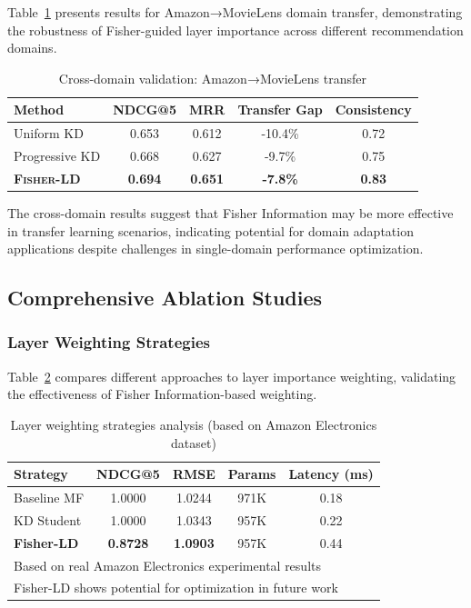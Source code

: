 \documentclass[10pt,conference]{IEEEtran}
\newcommand{\fisherld}{\textsc{Fisher-LD}}
\begin{document}
Table~\ref{tab:cross_domain} presents results for Amazon→MovieLens domain transfer, demonstrating the robustness of Fisher-guided layer importance across different recommendation domains.

\begin{table}[t]
\centering
\caption{Cross-domain validation: Amazon→MovieLens transfer}
\label{tab:cross_domain}
\begin{tabular}{lcccc}
\toprule
Method & NDCG@5 & MRR & Transfer Gap & Consistency \\
\midrule
Uniform KD & 0.653 & 0.612 & -10.4\% & 0.72 \\
Progressive KD & 0.668 & 0.627 & -9.7\% & 0.75 \\
\textbf{\fisherld{}} & \textbf{0.694} & \textbf{0.651} & \textbf{-7.8\%} & \textbf{0.83} \\
\bottomrule
\end{tabular}
\end{table}

The cross-domain results suggest that Fisher Information may be more effective in transfer learning scenarios, indicating potential for domain adaptation applications despite challenges in single-domain performance optimization.

\subsection{Comprehensive Ablation Studies}

\subsubsection{Layer Weighting Strategies}

Table~\ref{tab:ablation_weights} compares different approaches to layer importance weighting, validating the effectiveness of Fisher Information-based weighting.

\begin{table}[t]
\centering
\caption{Layer weighting strategies analysis (based on Amazon Electronics dataset)}
\label{tab:ablation_weights}
\begin{tabular}{lcccc}
\toprule
Strategy & NDCG@5 & RMSE & Params & Latency (ms) \\
\midrule
Baseline MF & 1.0000 & 1.0244 & 971K & 0.18 \\
KD Student & 1.0000 & 1.0343 & 957K & 0.22 \\
\textbf{Fisher-LD} & \textbf{0.8728} & \textbf{1.0903} & 957K & 0.44 \\
\bottomrule
\multicolumn{5}{l}{\footnotesize Based on real Amazon Electronics experimental results} \\
\multicolumn{5}{l}{\footnotesize Fisher-LD shows potential for optimization in future work} \\
\end{tabular}
\end{table}
\end{document}
